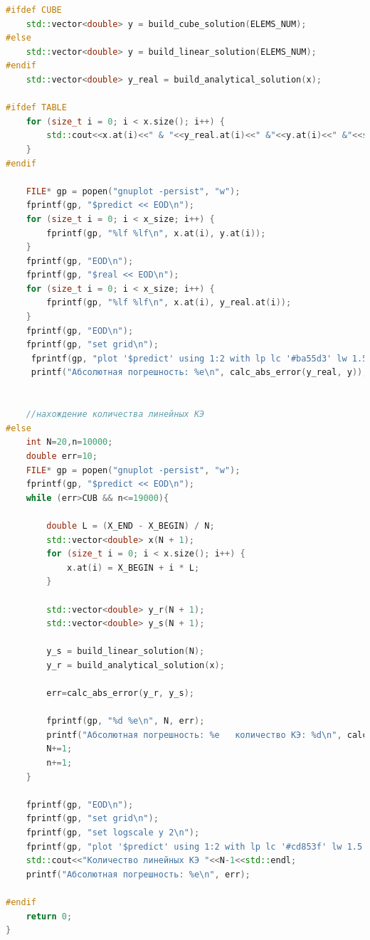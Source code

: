 \begin{lstlisting}[language=c++, label=prog,caption={\textit{Реализация МКЭ}}]
#ifdef CUBE
    std::vector<double> y = build_cube_solution(ELEMS_NUM);
#else
    std::vector<double> y = build_linear_solution(ELEMS_NUM);
#endif
    std::vector<double> y_real = build_analytical_solution(x);
     
#ifdef TABLE
    for (size_t i = 0; i < x.size(); i++) {
        std::cout<<x.at(i)<<" & "<<y_real.at(i)<<" &"<<y.at(i)<<" &"<<std::fabs(y_real.at(i) - y.at(i))<<"\\\\"<<std::endl;
    }
#endif    

    FILE* gp = popen("gnuplot -persist", "w");
    fprintf(gp, "$predict << EOD\n");
    for (size_t i = 0; i < x_size; i++) {
        fprintf(gp, "%lf %lf\n", x.at(i), y.at(i));
    }
    fprintf(gp, "EOD\n");
    fprintf(gp, "$real << EOD\n");
    for (size_t i = 0; i < x_size; i++) {
        fprintf(gp, "%lf %lf\n", x.at(i), y_real.at(i));
    }
    fprintf(gp, "EOD\n");
    fprintf(gp, "set grid\n");
     fprintf(gp, "plot '$predict' using 1:2 with lp lc '#ba55d3' lw 1.5 pt 7 ps 0.5 title 'МКЭ-решение (%zu КЭ)'," "'$real' using 1:2 with lines lc rgb '#afdafc' lt 1 lw 2 title 'аналитическое решение (%zu КЭ)',\n", ELEMS_NUM, ELEMS_NUM);
     printf("Абсолютная погрешность: %e\n", calc_abs_error(y_real, y));

     
    //нахождение количества линейных КЭ
#else
    int N=20,n=10000;
    double err=10;
    FILE* gp = popen("gnuplot -persist", "w");
    fprintf(gp, "$predict << EOD\n");
    while (err>CUB && n<=19000){
        
        double L = (X_END - X_BEGIN) / N;
        std::vector<double> x(N + 1);
        for (size_t i = 0; i < x.size(); i++) {
            x.at(i) = X_BEGIN + i * L;
        }
        
        std::vector<double> y_r(N + 1);
        std::vector<double> y_s(N + 1);
        
        y_s = build_linear_solution(N);
        y_r = build_analytical_solution(x);
        
        err=calc_abs_error(y_r, y_s);
        
        fprintf(gp, "%d %e\n", N, err);
        printf("Абсолютная погрешность: %e   количество КЭ: %d\n", calc_abs_error(y_r, y_s), N);
        N+=1;
        n+=1;
    }
    
    fprintf(gp, "EOD\n");
    fprintf(gp, "set grid\n");
    fprintf(gp, "set logscale y 2\n");
    fprintf(gp, "plot '$predict' using 1:2 with lp lc '#cd853f' lw 1.5 pt 7 ps 0.5 title 'Абсолютная погрешность',\n" );
    std::cout<<"Количество линейных КЭ "<<N-1<<std::endl;
    printf("Абсолютная погрешность: %e\n", err);

#endif 
    return 0;
}

\end{lstlisting}
